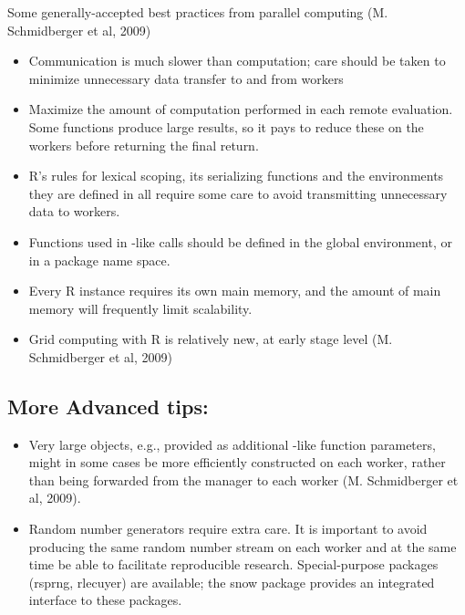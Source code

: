\documentclass[12pt]{article}
\begin{document}
Some generally-accepted best practices from parallel computing (M. Schmidberger et al, 2009)
\begin{itemize}
\item Communication is much slower than computation; care should be taken to minimize unnecessary data transfer to and from workers

\item Maximize the amount of computation performed in each remote evaluation.
Some functions produce large results, so it pays to reduce these on the workers before returning the final return.
 
\item R's rules for lexical scoping, its serializing functions and the environments they are defined in all require some care to avoid transmitting unnecessary data to workers. 

\item Functions used in   -like calls should be defined in the global environment, or in a package name space. 

\item Every R instance requires its own main memory, and the amount of main memory will frequently limit scalability.

\item Grid computing with R is relatively new, at early stage level (M. Schmidberger et al, 2009)

\end{itemize}
\subsection*{More Advanced tips:}
\begin{itemize}

\item Very large objects, e.g., provided as additional -like function parameters,
might in some cases be more efficiently constructed on each worker, rather than
being forwarded from the manager to each worker (M. Schmidberger et al, 2009).

\item Random number generators require extra care. It is important to avoid producing the
same random number stream on each worker and at the same time be able to facilitate reproducible research.
Special-purpose packages (rsprng, rlecuyer) are available; the snow package provides
an integrated interface to these packages.

\end{itemize}
 
\end{document}
